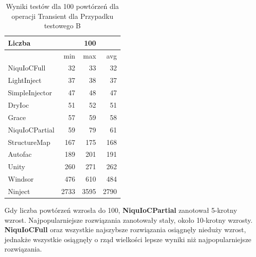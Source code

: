 \documentclass[12pt]{article}
\begin{document}
\begin{table}[H]
\captionsetup{belowskip=0pt,aboveskip=0pt}
\begin{center}
\begin{small}
	\begin{tabular}{ | l | r r r | }
    		\hline
Liczba & & 100 & \\ \hline
 & min & max & avg \\ \hline
NiquIoCFull & 32 & 33 & 32 \\ \hline
LightInject & 37 & 38 & 37 \\ \hline
SimpleInjector & 47 & 48 & 47 \\ \hline
DryIoc & 51 & 52 & 51 \\ \hline
Grace & 57 & 59 & 58 \\ \hline
NiquIoCPartial & 59 & 79 & 61 \\ \hline
StructureMap & 167 & 175 & 168 \\ \hline
Autofac & 189 & 201 & 191 \\ \hline
Unity & 260 & 271 & 262 \\ \hline
Windsor & 476 & 610 & 484 \\ \hline
Ninject & 2733 & 3595 & 2790 \\ \hline
  	\end{tabular}
\end{small}
\end{center}
\caption{Wyniki testów dla 100 powtórzeń dla operacji Transient dla Przypadku testowego B}
\label{TestCaseB_Transient100}
\end{table}
Gdy liczba powtórzeń wzrosła do 100, \textbf{NiquIoCPartial} zanotował 5-krotny wzrost. Najpopularniejsze rozwiązania zanotowały stały, około 10-krotny wzrosty. \textbf{NiquIoCFull} oraz wszystkie najszybsze rozwiązania osiągnęły nieduży wzrost, jednakże wszystkie osiągnęły o rząd wielkości lepsze wyniki niż najpopularniejsze rozwiązania.
\\ \\
\end{document}
